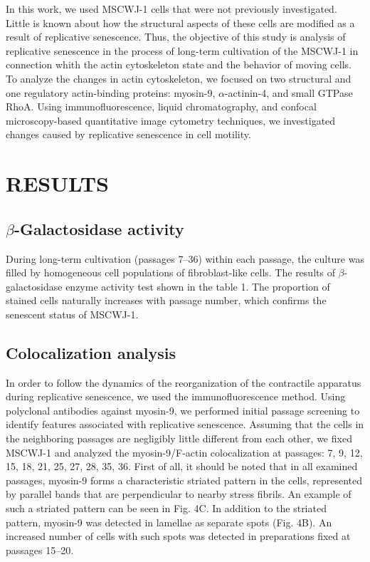 \documentclass[alpha-refs]{wiley-article}
\begin{document}
In this work, we used MSCWJ-1 cells that were not previously investigated.
Little is known about how the structural aspects of these cells are modified as a result of replicative senescence.
Thus, the objective of this study is analysis of replicative senescence in the process of long-term cultivation of the MSCWJ-1 in connection whith the actin cytoskeleton state and the behavior of moving cells.
To analyze the changes in actin cytoskeleton, we focused on two structural and one regulatory actin-binding proteins: myosin-9, $\alpha$-actinin-4, and small GTPase RhoA.
Using immunofluorescence, liquid chromatography, and confocal microscopy-based quantitative image cytometry techniques, we investigated changes caused by replicative senescence in cell motility.

\section{RESULTS}

\subsection{$\beta$-Galactosidase activity}

During long-term cultivation (passages 7--36) within each passage, the culture was filled by homogeneous cell populations of fibroblast-like cells.
The results of $\beta$-galactosidase enzyme activity test shown in the table 1.
The proportion of stained cells naturally increases with passage number, which confirms the senescent status of MSCWJ-1.

\subsection{Colocalization analysis}

In order to follow the dynamics of the reorganization of the contractile apparatus during replicative senescence, we used the immunofluorescence method.
Using polyclonal antibodies against myosin-9, we performed initial passage screening to identify features associated with replicative senescence.
Assuming that the cells in the neighboring passages are negligibly little different from each other, we fixed MSCWJ-1 and analyzed the myosin-9/F-actin colocalization at passages: 7, 9, 12, 15, 18, 21, 25, 27, 28, 35, 36.
First of all, it should be noted that in all examined passages, myosin-9 forms a characteristic striated pattern in the cells, represented by parallel bands that are perpendicular to nearby stress fibrils.
An example of such a striated pattern can be seen in Fig. 4C.
In addition to the striated pattern, myosin-9 was detected in lamellae as separate spots (Fig. 4B).
An increased number of cells with such spots was detected in preparations fixed at passages 15--20.
\end{document}
